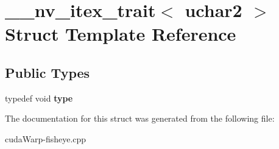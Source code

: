 \hypertarget{struct____nv__itex__trait_3_01uchar2_01_4}{}\section{\+\_\+\+\_\+nv\+\_\+itex\+\_\+trait$<$ uchar2 $>$ Struct Template Reference}
\label{struct____nv__itex__trait_3_01uchar2_01_4}
\subsection*{Public Types}
\begin{DoxyCompactItemize}
\item 
typedef void {\bfseries type}\hypertarget{struct____nv__itex__trait_3_01uchar2_01_4_a63f5c1d0bfa3836268c5eed8c86b36f6}{}\label{struct____nv__itex__trait_3_01uchar2_01_4_a63f5c1d0bfa3836268c5eed8c86b36f6}

\end{DoxyCompactItemize}


The documentation for this struct was generated from the following file\+:\begin{DoxyCompactItemize}
\item 
cuda\+Warp-\/fisheye.\+cpp\end{DoxyCompactItemize}
